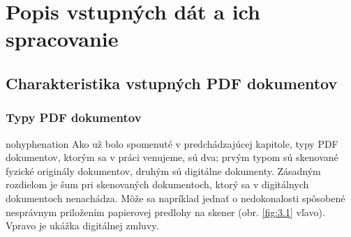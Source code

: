 \chapter{Popis vstupných dát a ich spracovanie}
\label{chap:ThirdChapter}
\section{Charakteristika vstupných PDF dokumentov}
\subsection{Typy PDF dokumentov}
\begin{hyphenrules}{nohyphenation}
Ako už bolo spomenuté v predchádzajúcej kapitole, typy PDF dokumentov, ktorým sa v práci venujeme, sú dva; prvým typom sú skenované fyzické originály dokumentov, druhým sú digitálne dokumenty. Zásadným rozdielom je šum pri skenovaných dokumentoch, ktorý sa v digitálnych dokumentoch nenachádza. Môže sa napríklad jednať o nedokonalosti spôsobené nesprávnym priložením papierovej predlohy na skener (obr.  \ref{fig:3.1} vľavo). Vpravo je ukážka digitálnej zmluvy.


\end{hyphenrules}
